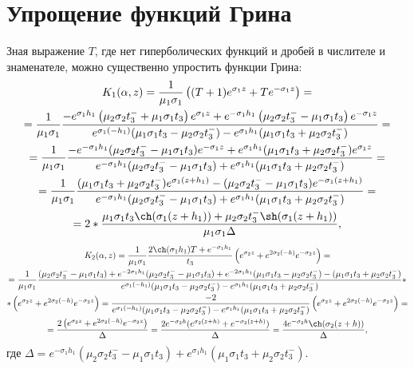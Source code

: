 \documentclass[a4paper, 12pt]{article}
\newcommand{\s}[1]{\sigma_{#1}}
\newcommand{\m}[1]{\mu_{#1}}
\newcommand{\E}[2]{e^{#1 #2}}
\begin{document}
\section{Упрощение функций Грина}
Зная выражение $T$, где нет гиперболических функций и дробей в числителе и знаменателе, можно существенно упростить функции Грина:
\begin{multline}
    K_1(\alpha,z)=\frac{1}{\m{1}\s{1}}\left((T+1)\E{\s{1}}{z}+T\E{-\s{1}}{z} \right)=\\
    =\frac{1}{\m{1}\s{1}}\frac{-\E{\s{1}}{h_1}\left( \m{2}\s{2}t_3^- + \m{1}\s{1}t_3\right)\E{\s{1}}{z}+\E{-\s{1}}{h_1}\left(\m{2}\s{2}t_3^- - \m{1}\s{1}t_3\right)\E{-\s{1}}{z}}{\E{\s{1}}{(-h_1)}(\m{1}\s{1}t_3-\m{2}\s{2}t_3^-)-\E{\s{1}}{h_1}(\m{1}\s{1}t_3+\m{2}\s{2}t_3^-)}=\\
    =\frac{1}{\m{1}\s{1}}\frac{-\E{-\s{1}}{h_1}(\m{2}\s{2}t_3^--\m{1}\s{1}t_3)\E{-\s{1}}{z}+\E{\s{1}}{h_1}(\m{1}\s{1}t_3+\m{2}\s{2}t_3^-)\E{\s{1}}{z}}
    {\E{-\s{1}}{h_1}(\m{2}\s{2}t_3^--\m{1}\s{1}t_3)+\E{\s{1}}{h_1}(\m{1}\s{1}t_3+\m{2}\s{2}t_3^-)}=\\
    =\frac{1}{\m{1}\s{1}}\frac{(\m{1}\s{1}t_3+\m{2}\s{2}t_3^-)\E{\s{1}}{(z+h_1)}-(\m{2}\s{2}t_3^--\m{1}\s{1}t_3)\E{-\s{1}}{(z+h_1)}}{\E{-\s{1}}{h_1}(\m{2}\s{2}t_3^--\m{1}\s{1}t_3)+\E{\s{1}}{h_1}(\m{1}\s{1}t_3+\m{2}\s{2}t_3^-)}=\\
    =2*\frac{\m{1}\s{1}t_3\ch(\s{1}(z+h_1))+\m{2}\s{2}t_3^-\sh(\s{1}(z+h_1))}{\m{1}\s{1}\Delta},
    \end{multline}
    \begin{multline}
        K_2(\alpha,z)=\frac{1}{\m{1} \s{1}}\frac{2\ch(\s{1}h_1) T+\E{-\s{1}}{h_1}}{t_3}\left(\E{\s{2}}{z}+ \E{2\s{2}}{(-h)} \E{-\s{2}}{z} \right)=\\
        =\frac{1}{\m{1}\s{1}}
        \frac{(\m{2}\s{2}t_3^--\m{1}\s{1}t_3)+e^{-2\s{1}h_1}(\m{2}\s{2}t_3^--\m{1}\s{1}t_3)+e^{-2\s{1}h_1}(\m{1}\s{1}t_3-\m{2}\s{2}t_3^-)-(\m{1}\s{1}t_3+\m{2}\s{2}t_3^-)}
        {\E{\s{1}}{(-h_1)}(\m{1}\s{1}t_3-\m{2}\s{2}t_3^-)-\E{\s{1}}{h_1}(\m{1}\s{1}t_3+\m{2}\s{2}t_3^-)}*\\
        *\left(\E{\s{2}}{z}+ \E{2\s{2}}{(-h)} \E{-\s{2}}{z} \right)=\frac{-2}{\E{\s{1}}{(-h_1)}(\m{1}\s{1}t_3-\m{2}\s{2}t_3^-)-\E{\s{1}}{h_1}(\m{1}\s{1}t_3+\m{2}\s{2}t_3^-)}\left(\E{\s{2}}{z}+ \E{2\s{2}}{(-h)} \E{-\s{2}}{z} \right)=\\
        =\frac{2\left(\E{\s{2}}{z}+ \E{2\s{2}}{(-h)} \E{-\s{2}}{z} \right)}{\Delta}=\frac{2e^{-\s{2}h}(e^{\s{2}(z+h)}+e^{-\s{2}(z+h)})}{\Delta}=\frac{4e^{-\s{2}h}\ch (\s{2}(z+h))}{\Delta},
    \end{multline}
где $\Delta=\E{-\s{1}}{h_1}(\m{2}\s{2}t_3^--\m{1}\s{1}t_3)+\E{\s{1}}{h_1}(\m{1}\s{1}t_3+\m{2}\s{2}t_3^-)$.
\end{document}
